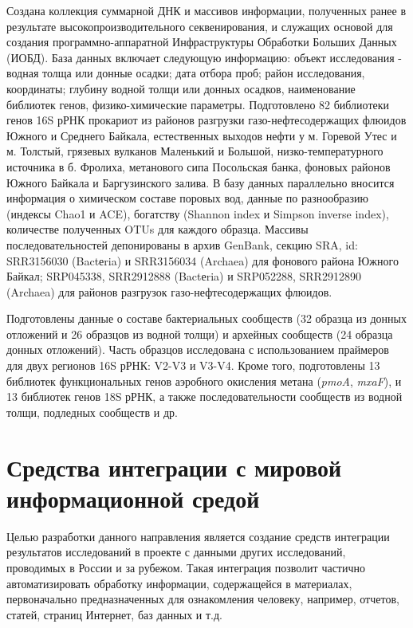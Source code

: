 \documentclass[a4paper,12pt,openany,final]{extreport}
\begin{document}
Создана коллекция суммарной ДНК и массивов информации, полученных ранее
в результате высокопроизводительного секвенирования, и служащих основой
для создания программно-аппаратной Инфраструктуры Обработки Больших
Данных (ИОБД). База данных включает следующую информацию: объект
исследования - водная толща или донные осадки; дата отбора проб; район
исследования, координаты; глубину водной толщи или донных осадков,
наименование библиотек генов, физико-химические параметры. Подготовлено
82 библиотеки генов 16S рРНК прокариот из районов разгрузки
газо-нефтесодержащих флюидов Южного и Среднего Байкала, естественных
выходов нефти у м. Горевой Утес и м. Толстый, грязевых вулканов
Маленький и Большой, низко-температурного источника в б. Фролиха,
метанового сипа Посольская банка, фоновых районов Южного Байкала и
Баргузинского залива. В базу данных параллельно вносится информация о
химическом составе поровых вод, данные по разнообразию (индексы Chao1 и
ACE), богатству (Shannon index и Simpson inverse index), количестве
полученных OTUs для каждого образца. Массивы последовательностей
депонированы в архив GenBank, секцию SRA, id: SRR3156030 (Bactеria) и
SRR3156034 (Archaea) для фонового района Южного Байкал; SRP045338,
SRR2912888 (Bactеria) и SRP052288, SRR2912890 (Archaea) для районов
разгрузок газо-нефтесодержащих флюидов.

Подготовлены данные о составе бактериальных сообществ (32 образца из
донных отложений и 26 образцов из водной толщи) и архейных сообществ (24
образца донных отложений). Часть образцов исследована с использованием
праймеров для двух регионов 16S рРНК: V2-V3 и V3-V4. Кроме того,
подготовлены 13 библиотек функциональных генов аэробного окисления
метана (\emph{pmoA}, \emph{mxaF}), и 13 библиотек генов 18S рРНК, а также последовательности сообществ из водной
толщи, подледных сообществ и др.

\chapter{Средства интеграции с мировой информационной средой}\label{chap:7}

Целью разработки данного направления является создание средств
интеграции результатов исследований в проекте с данными других
исследований, проводимых в России и за рубежом. Такая интеграция
позволит частично автоматизировать обработку информации, содержащейся в
материалах, первоначально предназначенных для ознакомления человеку,
например, отчетов, статей, страниц Интернет, баз данных и т.д.
\end{document}
